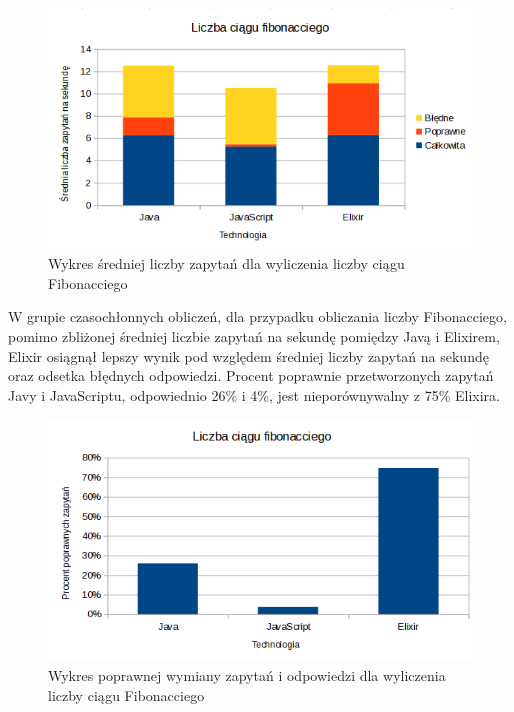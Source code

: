 \documentclass[12pt,twoside]{article}
\begin{document}
\begin{figure}[!ht]
\centering
\includegraphics[resolution=120]{test_results/summary/fib_avg.png}
\caption{Wykres średniej liczby zapytań dla wyliczenia liczby ciągu Fibonacciego}
\end{figure}

W grupie czasochłonnych obliczeń, dla przypadku obliczania liczby
Fibonacciego, pomimo zbliżonej średniej liczbie zapytań na sekundę
pomiędzy Javą i Elixirem, Elixir osiągnął lepszy wynik pod względem
średniej liczby zapytań na sekundę oraz odsetka błędnych odpowiedzi.
Procent poprawnie przetworzonych zapytań Javy i JavaScriptu, odpowiednio
26\% i 4\%, jest nieporównywalny z 75\% Elixira.

\begin{figure}[!ht]
\centering
\includegraphics[resolution=120]{test_results/summary/fib_percentage.png}
\caption{Wykres poprawnej wymiany zapytań i odpowiedzi dla wyliczenia liczby ciągu Fibonacciego}
\end{figure}
\end{document}
